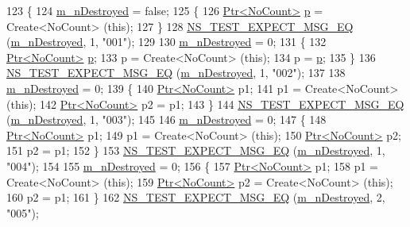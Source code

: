 \begin{DoxyCode}
123 \{
124   \hyperlink{classPtrTestCase_a189fef4a0d0e348de7554be35da17977}{m\_nDestroyed} = \textcolor{keyword}{false};
125   \{
126     \hyperlink{classns3_1_1Ptr}{Ptr<NoCount>} \hyperlink{lte__link__budget_8m_ac9de518908a968428863f829398a4e62}{p} = Create<NoCount> (\textcolor{keyword}{this});
127   \}
128   \hyperlink{group__testing_ga7304ba46a28d8cf08dfdfd6499cf7068}{NS\_TEST\_EXPECT\_MSG\_EQ} (\hyperlink{classPtrTestCase_a189fef4a0d0e348de7554be35da17977}{m\_nDestroyed}, 1, \textcolor{stringliteral}{"001"});
129 
130   \hyperlink{classPtrTestCase_a189fef4a0d0e348de7554be35da17977}{m\_nDestroyed} = 0;
131   \{
132     \hyperlink{classns3_1_1Ptr}{Ptr<NoCount>} \hyperlink{lte__link__budget_8m_ac9de518908a968428863f829398a4e62}{p};
133     p = Create<NoCount> (\textcolor{keyword}{this});
134     p = \hyperlink{lte__link__budget_8m_ac9de518908a968428863f829398a4e62}{p};
135   \}
136   \hyperlink{group__testing_ga7304ba46a28d8cf08dfdfd6499cf7068}{NS\_TEST\_EXPECT\_MSG\_EQ} (\hyperlink{classPtrTestCase_a189fef4a0d0e348de7554be35da17977}{m\_nDestroyed}, 1, \textcolor{stringliteral}{"002"});
137 
138   \hyperlink{classPtrTestCase_a189fef4a0d0e348de7554be35da17977}{m\_nDestroyed} = 0;
139   \{
140     \hyperlink{classns3_1_1Ptr}{Ptr<NoCount>} p1;
141     p1 = Create<NoCount> (\textcolor{keyword}{this});
142     \hyperlink{classns3_1_1Ptr}{Ptr<NoCount>} p2 = p1;
143   \}
144   \hyperlink{group__testing_ga7304ba46a28d8cf08dfdfd6499cf7068}{NS\_TEST\_EXPECT\_MSG\_EQ} (\hyperlink{classPtrTestCase_a189fef4a0d0e348de7554be35da17977}{m\_nDestroyed}, 1, \textcolor{stringliteral}{"003"});
145 
146   \hyperlink{classPtrTestCase_a189fef4a0d0e348de7554be35da17977}{m\_nDestroyed} = 0;
147   \{
148     \hyperlink{classns3_1_1Ptr}{Ptr<NoCount>} p1;
149     p1 = Create<NoCount> (\textcolor{keyword}{this});
150     \hyperlink{classns3_1_1Ptr}{Ptr<NoCount>} p2;
151     p2 = p1;
152   \}
153   \hyperlink{group__testing_ga7304ba46a28d8cf08dfdfd6499cf7068}{NS\_TEST\_EXPECT\_MSG\_EQ} (\hyperlink{classPtrTestCase_a189fef4a0d0e348de7554be35da17977}{m\_nDestroyed}, 1, \textcolor{stringliteral}{"004"});
154 
155   \hyperlink{classPtrTestCase_a189fef4a0d0e348de7554be35da17977}{m\_nDestroyed} = 0;
156   \{
157     \hyperlink{classns3_1_1Ptr}{Ptr<NoCount>} p1;
158     p1 = Create<NoCount> (\textcolor{keyword}{this});
159     \hyperlink{classns3_1_1Ptr}{Ptr<NoCount>} p2 = Create<NoCount> (\textcolor{keyword}{this});
160     p2 = p1;
161   \}
162   \hyperlink{group__testing_ga7304ba46a28d8cf08dfdfd6499cf7068}{NS\_TEST\_EXPECT\_MSG\_EQ} (\hyperlink{classPtrTestCase_a189fef4a0d0e348de7554be35da17977}{m\_nDestroyed}, 2, \textcolor{stringliteral}{"005"});

\end{DoxyCode}
